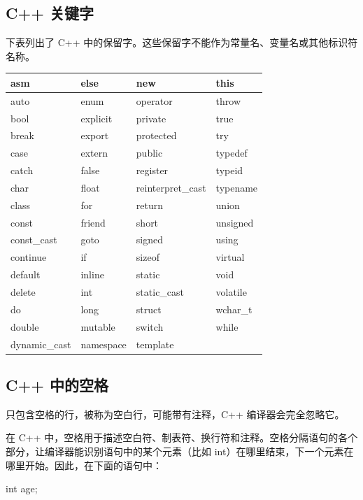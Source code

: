 \documentclass[
]{article}
\newenvironment{Shaded}{}{}
\newcommand{\DataTypeTok}[1]{\textcolor[rgb]{0.56,0.13,0.00}{#1}}
\newcommand{\NormalTok}[1]{#1}
\newcommand{\OperatorTok}[1]{\textcolor[rgb]{0.40,0.40,0.40}{#1}}
\begin{document}
\hypertarget{c-ux5173ux952eux5b57}{%
\subsection{C++ 关键字}\label{c-ux5173ux952eux5b57}}

下表列出了 C++
中的保留字。这些保留字不能作为常量名、变量名或其他标识符名称。

\begin{longtable}[]{@{}llll@{}}
\toprule
asm & else & new & this \\
\midrule
\endhead
auto & enum & operator & throw \\
bool & explicit & private & true \\
break & export & protected & try \\
case & extern & public & typedef \\
catch & false & register & typeid \\
char & float & reinterpret\_cast & typename \\
class & for & return & union \\
const & friend & short & unsigned \\
const\_cast & goto & signed & using \\
continue & if & sizeof & virtual \\
default & inline & static & void \\
delete & int & static\_cast & volatile \\
do & long & struct & wchar\_t \\
double & mutable & switch & while \\
dynamic\_cast & namespace & template & \\
\bottomrule
\end{longtable}

\hypertarget{c-ux4e2dux7684ux7a7aux683c}{%
\subsection{C++ 中的空格}\label{c-ux4e2dux7684ux7a7aux683c}}

只包含空格的行，被称为空白行，可能带有注释，C++ 编译器会完全忽略它。

在 C++
中，空格用于描述空白符、制表符、换行符和注释。空格分隔语句的各个部分，让编译器能识别语句中的某个元素（比如
int）在哪里结束，下一个元素在哪里开始。因此，在下面的语句中：

\begin{Shaded}
\begin{Highlighting}[]
\DataTypeTok{int}\NormalTok{ age}\OperatorTok{;}
\end{Highlighting}
\end{Shaded}
\end{document}
